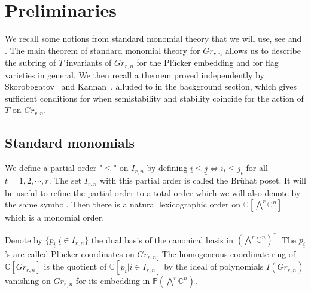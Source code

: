 \section{Preliminaries}
 
We recall some notions from standard monomial theory that we will use, see \cite{seshadriintroduction} and \cite{lakshmibai2007standard}. The main theorem of standard monomial theory for $Gr_{r,n}$ allows us to describe the subring of $T$ invariants of $Gr_{r,n}$ for the Pl\"{u}cker embedding and for flag varieties in general. We then recall a theorem proved independently by Skorobogatov~\cite{skorobogatov1993swinnerton} and Kannan~\cite{kannan1998torus}, alluded to in the background section, which gives sufficient conditions for when semistability and stability coincide for the action of $T$ on $Gr_{r,n}$.
  
\subsection{Standard monomials}
 \label{sec:std:monom}
 We define a partial order "$\leq$" on $I_{r,n}$ by defining $ {\underline{i}} \leq {\underline{j}} \Leftrightarrow i_t \leq j_t$ for all $t = 1,2,\cdots,r$. The set $I_{r,n}$ with this partial order is called the Br\"{u}hat poset.  It will be useful to refine the partial order to a total order which we will also denote by the same symbol. Then there is a natural lexicographic order on ${\mathbb C}[\bigwedge^r {\mathbb C}^n]$ which is a 
 monomial order.
 
Denote by $\{p_{\underline{i}} | {\underline{i}} \in I_{r,n}\}$ the dual basis of the canonical basis in  $(\bigwedge^r{\mathbb C}^n)^*$. The $p_{\underline{i}}$'s are called Pl\"{u}cker coordinates on $Gr_{r,n}$. The homogeneous coordinate ring of ${\mathbb C}[Gr_{r,n}]$ is the quotient of ${\mathbb C}[p_{\underline{i}} | {\underline{i}} \in I_{r,n}]$ by the ideal of polynomials $I(Gr_{r,n})$ vanishing on $Gr_{r,n}$ for its embedding in ${\mathbb P}(\bigwedge^r{\mathbb C}^n)$.  
  

